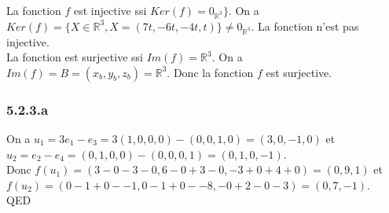 \documentclass[]{book}
\theoremstyle{definition}
\newcommand{\bb}[1]{\mathbb{#1}}
\newcommand{\R}{\bb{R}}
\begin{document}
La fonction $f$ est injective ssi $Ker(f) = 0_{\R^3}\}$. On a $Ker(f)= \{X \in \R^3, X=(7t,-6t, -4t, t)\} \neq 0_{\R^3}$. La fonction n'est pas injective.\\

La fonction est surjective ssi $Im(f) = \R^3$. On a $Im(f) = B=(x_b,y_b,z_b) = \R^3$. Donc la fonction $f$ est surjective.

\subsubsection*{5.2.3.a}
On a $u_1 = 3e_1-e_3 = 3(1,0,0,0)-(0,0,1,0) = (3,0,-1,0)$ et $u_2 = e_2 -e_4 = (0,1,0,0) - (0,0,0,1) = (0,1,0,-1)$.\\
Donc $f(u_1) = (3 - 0 -3 - 0, 6 - 0 +3 -0, -3 + 0 +4 +0)= (0, 9 ,1)$ et 
$f(u_2) = (0-1+0--1, 0 -1 + 0 --8, -0 + 2 -0 -3) = (0,7,-1)$. \\



QED
\end{document}

